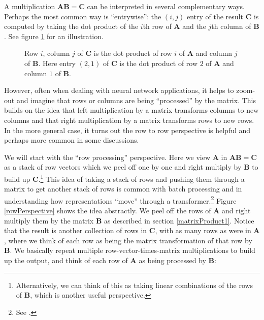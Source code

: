 A multiplication $\mathbf{A}\mathbf{B} = \mathbf{C}$ can be interpreted in several complementary ways. Perhaps the most common way is ``entrywise'': the $(i,j)$ entry of the result $\mathbf{C}$ is computed by taking the dot product of the $i$th row of $\mathbf{A}$ and the $j$th column of $\mathbf{B}$. See figure \ref{entryWiseMatrixProduct} for an illustration. 

\begin{figure}[h]
\centering
{}
\caption[Jeff Yoshimi.]{Row $i$, column $j$ of $\mathbf{C}$ is the dot product of row $i$ of $\mathbf{A}$ and column $j$ of $\mathbf{B}$. Here entry $(2,1)$ of $\mathbf{C}$ is the dot product of row $2$ of $\mathbf{A}$ and column $1$ of $\mathbf{B}$.}
\label{entryWiseMatrixProduct}
\end{figure}

However, often when dealing with neural network applications, it helps to zoom-out and imagine that rows or columns are being ``processed'' by the matrix. This builds on the idea that left multiplication by a matrix transforms columns to 
new columns and that right multiplication by a matrix transforms rows to new 
rows. In the more general case, it turns out the row to row perspective is 
helpful and perhaps more common in some discussions. 

We will start with the ``row processing'' perspective. Here we view $\mathbf{A}$ in  $\mathbf{A}\mathbf{B} = \mathbf{C}$ as a stack of row vectors which we peel off one by one and right multiply by $\mathbf{B}$ to build up $\mathbf{C}$.\footnote{Alternatively, we can think of this as taking linear combinations of the rows of $\mathbf{B}$, which is another useful perspective.} This idea of taking a stack of rows and pushing them through a matrix to get another stack of rows is common with batch processing and in understanding how representations ``move'' through a transformer.\footnote{See .} Figure \ref{rowPerspective} shows the idea abstractly. We peel off the rows of $\mathbf{A}$ and right multiply them by the matrix $\mathbf{B}$ as described in section \ref{matrixProduct1}. Notice that the result is another collection of rows in $\mathbf{C}$, with as many rows as were in $\mathbf{A}$, where we think of each row as being the matrix transformation of that row by $\mathbf{B}$. We basically repeat multiple row-vector-times-matrix multiplications to build up the output, and think of each row of $\mathbf{A}$ as being processed by $\mathbf{B}$:

